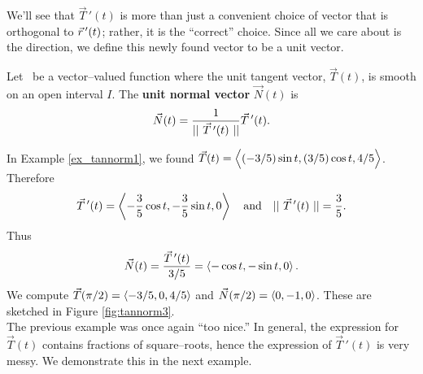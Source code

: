We'll see that $\vec T\,'(t)$ is more than just a convenient choice of vector that is orthogonal to $\vec r\, '(t)$; rather, it is the ``correct'' choice. Since all we care about is the direction, we define this newly found vector to be a unit vector.

{Let \vrt\ be a vector--valued function where the unit tangent vector, $\vec T(t)$, is smooth on an open interval $I$. The \textbf{unit normal vector} $\vec N(t)$ is
$$\vec N(t) = \frac1{||\ \vec T\,'(t)\ ||}\vec T\,'(t).$$
}

{In Example \ref{ex_tannorm1}, we found $\vec T(t) = \la \rule{0pt}{10pt} (-3/5)\sin t,(3/5)\cos t,4/5\ra$. Therefore 
$$\vec T\,'(t) = \left\langle -\frac35\cos t,-\frac35\sin t,0\right\rangle\quad \text{and} \quad ||\ \vec T\,'(t)\ || = \frac35.$$
Thus $$\vec N(t) = \frac{\vec T\,'(t)}{3/5} = \left\langle -\cos t,-\sin t,0\right\rangle.$$
We compute $\vec T(\pi/2) = \left\langle -3/5,0,4/5\right\rangle$ and $\vec N(\pi/2) = \left\langle 0,-1,0\right\rangle$. These are sketched in Figure \ref{fig:tannorm3}.
}\\

The previous example was once again ``too nice.'' In general, the expression for $\vec T(t)$ contains fractions of square--roots, hence the expression of $\vec T\,'(t)$ is very messy. We demonstrate this in the next example.\\

